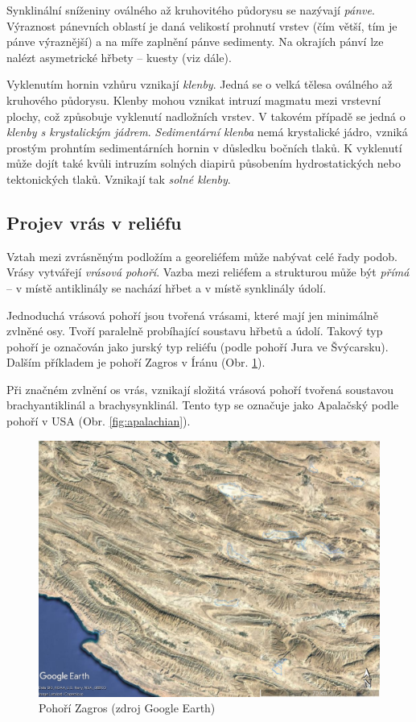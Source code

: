 Synklinální sníženiny oválného až kruhovitého půdorysu se nazývají \emph{pánve}. Výraznost pánevních oblastí je daná velikostí prohnutí vrstev (čím větší, tím je pánve výraznější) a na míře zaplnění pánve sedimenty. Na okrajích pánví lze nalézt asymetrické hřbety -- kuesty (viz dále). 

Vyklenutím hornin vzhůru vznikají \emph{klenby}. Jedná se o velká tělesa oválného až kruhového půdorysu. Klenby mohou vznikat intruzí magmatu mezi vrstevní plochy, což způsobuje vyklenutí nadložních vrstev. V takovém případě se jedná o \emph{klenby s krystalickým jádrem}. \emph{Sedimentární klenba} nemá krystalické jádro, vzniká prostým prohntím sedimentárních hornin v důsledku bočních tlaků. K vyklenutí může dojít také kvůli intruzím solných diapirů působením hydrostatických nebo tektonických tlaků. Vznikají tak \emph{solné klenby}. 

\subsection{Projev vrás v reliéfu}
Vztah mezi zvrásněným podložím a georeliéfem může nabývat celé řady podob. Vrásy vytvářejí \emph{vrásová pohoří}. Vazba mezi reliéfem a strukturou může být \emph{přímá} -- v místě antiklinály se nachází hřbet a v místě synklinály údolí. 

Jednoduchá vrásová pohoří jsou tvořená vrásami, které mají jen minimálně zvlněné osy. Tvoří paralelně probíhající soustavu hřbetů a údolí. Takový typ pohoří je označován jako jurský typ reliéfu (podle pohoří Jura ve Švýcarsku). Dalším příkladem je pohoří Zagros v Íránu (Obr. \ref{fig:zagros}). 

Při značném zvlnění os vrás, vznikají složitá vrásová pohoří tvořená soustavou brachyantiklinál a brachysynklinál. Tento typ se označuje jako Apalačský podle pohoří v USA (Obr. \ref{fig:apalachian}).

\begin{figure}[h]
	\centering
	\includegraphics[width=1\linewidth]{obrazky/tectonic/zagros}
	\caption{Pohoří Zagros (zdroj Google Earth)}
	\label{fig:zagros}
\end{figure}

